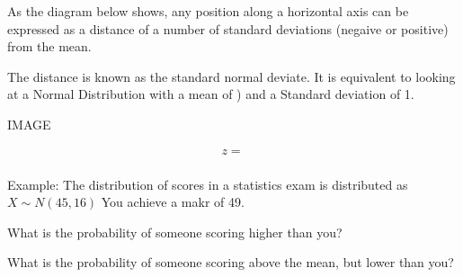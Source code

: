 As the diagram below shows, any position along a horizontal axis can be expressed as a distance of a number of standard deviations (negaive or positive) from the mean.

The distance is known as the standard normal deviate. It is equivalent to looking at a Normal Distribution with a mean of ) and a Standard deviation of 1.





IMAGE



\begin{framed}
\[  z = \frac{}{} \]
\end{framed}

Example: The distribution of scores in a statistics exam is distributed as $X \sim N(45,16)$ You achieve a makr of 49.

What is the probability of someone scoring higher than you?

What is the probability of someone scoring above the mean, but lower than you?
